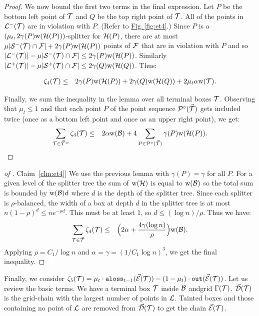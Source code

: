 \documentclass{acmsmall}
\newcommand{\cB}{{\cal B}}
\newcommand{\cD}{{\cal D}}
\newcommand{\cE}{{\cal E}}
\newcommand{\cF}{{\cal F}}
\newcommand{\cH}{{\cal H}}
\newcommand{\cL}{{\cal L}}
\newcommand{\cP}{{\cal P}}
\newcommand{\cS}{{\cal S}}
\newcommand{\cT}{{\cal T}}
\newcommand{\Fig}[1]{\hyperref[fig:#1]{Fig.\,\ref*{fig:#1}}} %
\newcommand{\Clm}[1]{\hyperref[clm:#1]{Claim~\ref*{clm:#1}}} %
\newcommand{\aloss}{{\tt aloss}}
\newcommand{\outside}{{\tt out}}
\newcommand{\width}{{\bf {\rm  w}}}
\newcommand{\gridprec}{\alpha}
\newcommand{\errorterm}{\zeta}
\begin{document}
\begin{proof}
We now bound the first two terms in the final expression.
Let $P$ be the bottom left point of $\cT$ and $Q$ be the top right point of $\cT$.
All of the points in $\cL^-(\cT)$ are in violation with $P$. (Refer to \Fig{et4}.)	  Since
$P$  is a $(\mu_t,2\gamma(P) \width(\cH(P)))$-splitter for $\cH(P)$, there are at most
$\mu|\cS^-(\cT) \cap \cF| + 2\gamma(P) \width(\cH(P))$ points of $\cF$ that are in violation with $P$
and so $|\cL^-(\cT)| - \mu|\cS^-(\cT) \cap \cF| \leq 2\gamma(P) \width(\cH(P))$.
Similarly  $|\cL^+(\cT)| - \mu|\cS^+(\cT) \cap \cF| \leq 2\gamma(Q) \width(\cH(Q))$. 
Thus:

\begin{eqnarray*}
\errorterm_4(\cT) 
& \leq &2\gamma(P)\width(\cH(P))+2\gamma(Q)\width(\cH(Q)) + 2\mu_t\gridprec \width(\cT).
\end{eqnarray*}

Finally, we sum the inequality in the lemma over all terminal boxes $\cT$. 
Observing that $\mu_t \leq 1$ and  that each point $P$ of the point sequence
$\cP^{\circ}(\vec{\cT})$ gets included twice (once as a bottom left point and once as an upper right point), we
get:
\begin{eqnarray*}
\sum_{\cT \in \vec{\cT}^w} \errorterm_4(\cT) & \leq & 2\gridprec \width(\cB) + 4\sum_{P \in \cP^{\circ}(\vec{\cT})}\gamma(P) \width(\cH(P)).
\end{eqnarray*}
\end{proof}

\begin{proof}[of \Clm{et4}]
We use the previous lemma with $\gamma(P)=\gamma$ for all $P$.
For a given level of the splitter tree the sum of $\width(\cH)$ is equal to $\width(\cB)$ so the total sum is
bounded by $\width(\cB)d$ where $d$ is the depth of the splitter tree.  Since each splitter is $\rho$-balanced, the width of a box
at depth $d$ in the splitter tree is at most $n(1-\rho)^d \leq ne^{-\rho d}$. This must be at least 1, so $d \leq (\log n)/\rho$. 
Thus we have:
%
\begin{eqnarray}
\label{eterm 4 bound}
\sum_{\cT \in \vec{\cT}} \errorterm_4(\cT) & \leq & \Big(2 \gridprec + \frac{4\gamma (\log n)}{\rho}\Big)\width(\cB).
\end{eqnarray}
%
Applying $\rho = C_1/\log n$ and $\alpha = \gamma = (1/C_1\log n)^3$, we get the final inequality.
\end{proof}
%
Finally, we consider $\errorterm_5(\cT)= \mu_t\cdot \aloss_{t-1}(\vec{\cE}(\cT)) - (1-\mu_t)\cdot \outside(\vec{\cE}(\cT))$. Let us review the basic terms. We have a terminal box $\cT$ inside $\cB$ andgrid $\Gamma(\cT)$. $\vec{\cD}(\cT)$ is the grid-chain with the largest number of points in $\cL$.
Tainted boxes and those containing no point of $\cL$ are removed from $\vec{\cD}(\cT)$ to get
the chain $\vec{\cE}(\cT)$. 
\end{document}

